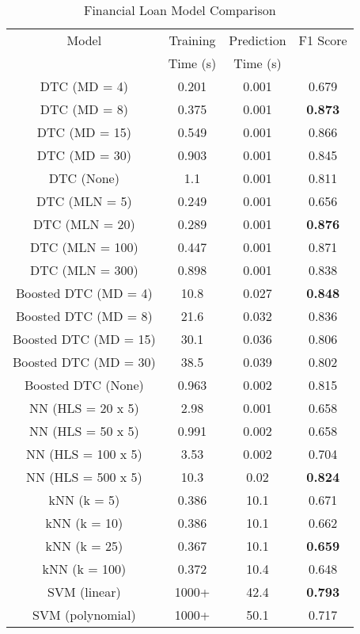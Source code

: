 \documentclass[10pt,journal,compsoc]{IEEEtran}
\begin{document}
\begin{table} 
	\begin{center}
		\caption {Financial Loan Model Comparison} 
		\begin{tabular}{ | c | c | c | c | } 
			
			Model & Training & Prediction & F1 Score \\ 
			& Time (s) & Time (s) & \\
			\hline
			DTC (MD = 4) & 0.201 & 0.001 & 0.679 \\ 
			\hline
			DTC (MD = 8) & 0.375 & 0.001 & \textbf{0.873} \\ 
			\hline
			DTC (MD = 15) & 0.549 & 0.001 & 0.866 \\ 
			\hline
			DTC (MD = 30) & 0.903 & 0.001 & 0.845 \\ 
			\hline
			DTC (None) & 1.1 & 0.001 & 0.811 \\ 
			\hline
			DTC (MLN = 5) & 0.249 & 0.001 & 0.656  \\ 
			\hline
			DTC (MLN = 20) & 0.289 & 0.001 & \color{green}\textbf{0.876} \\ 
			\hline
			DTC (MLN = 100) & 0.447 & 0.001 & 0.871 \\ 
			\hline
			DTC (MLN = 300) & 0.898 & 0.001 & 0.838 \\ 
			\hline
			Boosted DTC (MD = 4) & 10.8 & 0.027 & \textbf{0.848} \\ 
			\hline
			Boosted DTC (MD = 8) & 21.6 & 0.032 & 0.836 \\ 
			\hline
			Boosted DTC (MD = 15) & 30.1 & 0.036 & 0.806 \\ 
			\hline
			Boosted DTC (MD = 30) & 38.5 & 0.039 & 0.802 \\ 
			\hline
			Boosted DTC (None) & 0.963 & 0.002 & 0.815 \\ 
			\hline
			NN (HLS = 20 x 5) & 2.98 & 0.001 & 0.658 \\ 
			\hline
			NN (HLS = 50 x 5) & 0.991 & 0.002 & 0.658 \\ 
			\hline
			NN (HLS = 100 x 5) & 3.53 & 0.002 & 0.704 \\ 
			\hline
			NN (HLS = 500 x 5) & 10.3 & 0.02 & \textbf{0.824} \\ 
			\hline
			kNN (k = 5) & 0.386 & 10.1 & 0.671 \\ 
			\hline
			kNN (k = 10) & 0.386 & 10.1 & 0.662 \\ 
			\hline
			kNN (k = 25) & 0.367 & 10.1 & \textbf{0.659} \\ 
			\hline
			kNN (k = 100) & 0.372 & 10.4 & \color{red}0.648 \\ 
			\hline
			SVM (linear) & 1000+  & 42.4 & \textbf{0.793} \\ 
			\hline
			SVM (polynomial) & 1000+ & 50.1 & 0.717 \\ 
			\hline
		\end{tabular}
	\end{center}
\end{table}
\end{document}
